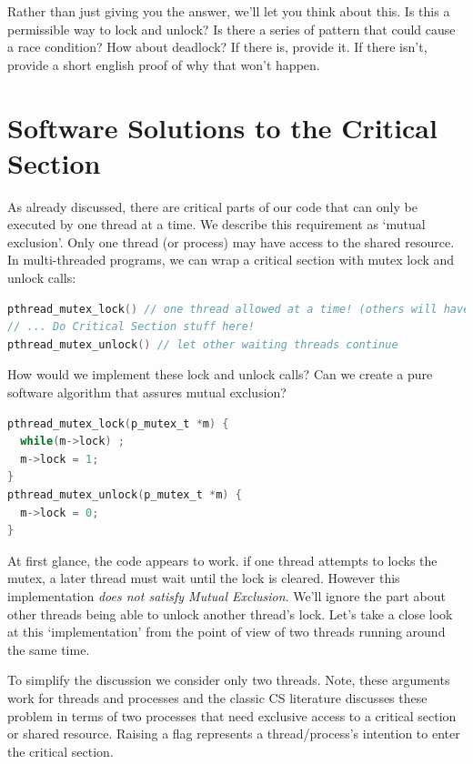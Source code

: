 Rather than just giving you the answer, we'll let you think about this.
Is this a permissible way to lock and unlock?
Is there a series of pattern that could cause a race condition?
How about deadlock?
If there is, provide it.
If there isn't, provide a short english proof of why that won't happen.


\section{Software Solutions to the Critical Section}

As already discussed, there are critical parts of our code that can only be executed by one thread at a time.
We describe this requirement as `mutual exclusion'.
Only one thread (or process) may have access to the shared resource.
In multi-threaded programs, we can wrap a critical section with mutex lock and unlock calls:

\begin{lstlisting}[language=C]
pthread_mutex_lock() // one thread allowed at a time! (others will have to wait here)
// ... Do Critical Section stuff here!
pthread_mutex_unlock() // let other waiting threads continue
\end{lstlisting}

How would we implement these lock and unlock calls?
Can we create a pure software algorithm that assures mutual exclusion?

\begin{lstlisting}[language=C]
pthread_mutex_lock(p_mutex_t *m) {
  while(m->lock) ;
  m->lock = 1;
}
pthread_mutex_unlock(p_mutex_t *m) {
  m->lock = 0;
}
\end{lstlisting}

At first glance, the code appears to work.
if one thread attempts to locks the mutex, a later thread must wait until the lock is cleared.
However this implementation \emph{does not satisfy Mutual Exclusion}.
We'll ignore the part about other threads being able to unlock another thread's lock.
Let's take a close look at this `implementation' from the point of view of two threads running around the same time.

To simplify the discussion we consider only two threads.
Note, these arguments work for threads and processes and the classic CS literature discusses these problem in terms of two processes that need exclusive access to a critical section or shared resource.
Raising a flag represents a thread/process's intention to enter the critical section.

